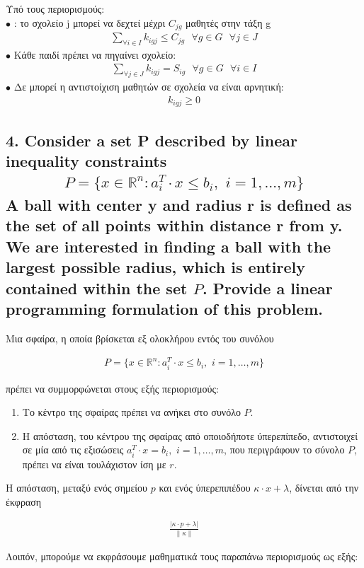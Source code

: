 \documentclass[12pt]{article}
\newcommand{\R}{\mathbb{R}}
\newcommand{\centered}[1]{\begin{align*}#1\end{align*}}
\newcommand{\margin}{\hspace{4pt}}
\newcommand{\norm}[1]{\left\lVert#1\right\rVert}
\newcommand{\abs}[1]{\left\lvert#1\right\rvert}
\begin{document}
Υπό τους περιορισμούς: \\
\( \bullet \) : το σχολείο j μπορεί να δεχτεί μέχρι \( C_{jg} \) μαθητές στην τάξη g  \\
\centered{ \sum_{\forall i \in I}{ k_{igj} \leq C_{jg} } \mbox{ } \forall g \in G \mbox{ } \forall j \in J  }
\( \bullet \) Κάθε παιδί πρέπει να πηγαίνει σχολείο: \\
\centered{ \sum_{\forall j \in J}{ k_{igj} = S_{ig} } \mbox{ } \forall g \in G \mbox{ } \forall i \in I  }
\( \bullet \) Δε μπορεί η αντιστοίχιση μαθητών σε σχολεία να είναι αρνητική: \\
\centered{ k_{igj} \geq 0 }

\vspace{2in}

\pagebreak

\subsection*{4. Consider a set P described by linear inequality constraints
\centered{P = \{x \in \R^n : a^{T}_{i} \cdot x \leq b_i, \margin i = 1, \dotsc, m\}}
A ball with center y and radius r is defined as the set of all points within distance r from y.
We are interested in finding a ball with the largest possible radius, which is entirely contained
within the set \( P \). Provide a linear programming formulation of this problem.}

Μια σφαίρα, η οποία βρίσκεται εξ ολοκλήρου εντός του συνόλου

\centered{P = \{x \in \R^n : a^{T}_{i} \cdot x \leq b_i, \margin i = 1, \dotsc, m\}}

πρέπει να συμμορφώνεται στους εξής περιορισμούς:

\begin{enumerate}
    \item Το κέντρο της σφαίρας πρέπει να ανήκει στο συνόλο \( P \).
    \item Η απόσταση, του κέντρου της σφαίρας από οποιοδήποτε ύπερεπίπεδο, αντιστοιχεί σε μία
    από τις εξισώσεις \( a^{T}_{i} \cdot x = b_i, \margin i = 1, \dotsc, m\),
    που περιγράφουν το σύνολο \( P \), πρέπει να είναι τουλάχιστον ίση με \( r \).
\end{enumerate}

Η απόσταση, μεταξύ ενός σημείου \( p \) και ενός ύπερεπιπέδου \( κ \cdot x + λ \),
δίνεται από την έκφραση

\centered{\frac{\abs{κ \cdot p + λ}}{\norm{κ}}}

Λοιπόν, μπορούμε να εκφράσουμε μαθηματικά τους παραπάνω περιορισμούς ως εξής:
\end{document}
